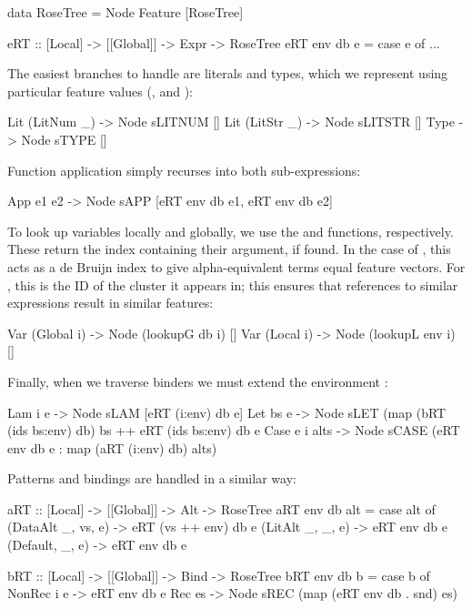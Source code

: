 \begin{haskell}
data RoseTree = Node Feature [RoseTree]

eRT :: [Local] -> [[Global]] -> Expr -> RoseTree
eRT env db e = case e of
  ...
\end{haskell}

The easiest branches to handle are literals and types, which we represent using particular feature values (,  and ):

\begin{haskell}
  Lit (LitNum _) -> Node sLITNUM []
  Lit (LitStr _) -> Node sLITSTR []
  Type           -> Node sTYPE   []
\end{haskell}

Function application simply recurses into both sub-expressions:

\begin{haskell}
  App e1 e2 -> Node sAPP [eRT env db e1,
                          eRT env db e2]
\end{haskell}

To look up variables locally and globally, we use the  and  functions, respectively. These return the index containing their argument, if found. In the case of , this acts as a de Bruijn index to give alpha-equivalent terms equal feature vectors. For , this is the ID of the cluster it appears in; this ensures that references to similar expressions result in similar features:

\begin{haskell}
  Var (Global i) -> Node (lookupG db  i) []
  Var (Local  i) -> Node (lookupL env i) []
\end{haskell}

Finally, when we traverse binders we must extend the environment :

\begin{haskell}
  Lam  i  e     -> Node sLAM [eRT (i:env) db e]
  Let  bs e     -> Node sLET (map (bRT (ids bs:env) db) bs ++
                                   eRT (ids bs:env) db  e
  Case e i alts -> Node sCASE (eRT    env  db  e :
                          map (aRT (i:env) db) alts)
\end{haskell}

Patterns and bindings are handled in a similar way:

\begin{haskell}
aRT :: [Local] -> [[Global]] -> Alt -> RoseTree
aRT env db alt = case alt of
  (DataAlt _, vs, e) -> eRT (vs ++ env) db e
  (LitAlt  _, _,  e) -> eRT env db e
  (Default,   _,  e) -> eRT env db e

bRT :: [Local] -> [[Global]] -> Bind -> RoseTree
bRT env db b = case b of
  NonRec i e -> eRT env db e
  Rec es     -> Node sREC (map (eRT env db . snd) es)
\end{haskell}

